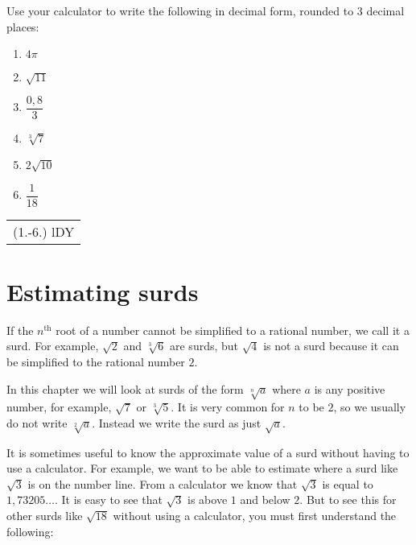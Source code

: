 \begin{exercises}{}
{
Use your calculator to write the following in decimal form, rounded to $3$ decimal places:
\begin{enumerate}[itemsep=5pt, label=\textbf{\arabic*}. ]
 \item $4\pi$
\item $\sqrt{11}$
\item $\dfrac{0,8}{3}$
\item $\sqrt[3]{7}$
\item $2\sqrt{10}$
\item $\dfrac{1}{18}$
\end{enumerate}
\practiceinfo 
\par 
 \par \begin{tabular}[h]{c}
 (1.-6.) lDY \end{tabular}
}

\end{exercises}


\section{Estimating surds}
\setcounter{figure}{1}
\setcounter{subfigure}{1}
If the ${n}^{\mathrm{th}}$ root of a number cannot be simplified to a rational number, we call it a surd. For example, $\sqrt{2}$ and $\sqrt[3]{6}$ are surds, but $\sqrt{4}$ is not a surd because it can be simplified to the rational number $2$.\par 
In this chapter we will look at surds of the form $\sqrt[n]{a}$ where $a$ is any positive number, for example, $\sqrt{7}$ or $\sqrt[3]{5}$. It is very common for $n$ to be $2$, so we usually do not write $\sqrt[2]{a}$. Instead we write the surd as just $\sqrt{a}$.\par 
It is sometimes useful to know the approximate value of a surd without having to use a calculator. For example, we want to be able to estimate where a surd like $\sqrt{3}$ is on the number line. From a calculator we know that $\sqrt{3}$ is equal to $1,73205\ldots$. It is easy to see that $\sqrt{3}$ is above $1$ and below $2$. But to see this for other surds like $\sqrt{18}$ without using a calculator, you must first understand the following:\par 


\par
       
